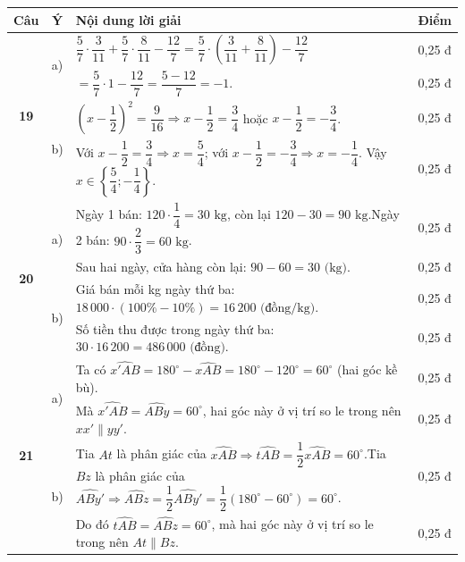 \documentclass[11pt,a4paper]{article}
\begin{document}
\noindent
\begin{tabularx}{\linewidth}{|c|c|X|c|}
\hline
\textbf{Câu} & \textbf{Ý} & \textbf{Nội dung lời giải} & \textbf{Điểm} \\ \hline
\multirow{4}{*}{\textbf{19}} & \multirow{2}{*}{a)} & $\dfrac{5}{7} \cdot \dfrac{3}{11} + \dfrac{5}{7} \cdot \dfrac{8}{11} - \dfrac{12}{7} = \dfrac{5}{7} \cdot \left(\dfrac{3}{11} + \dfrac{8}{11}\right) - \dfrac{12}{7}$ & 0,25 đ \\ \cline{3-4}
& & $= \dfrac{5}{7} \cdot 1 - \dfrac{12}{7} = \dfrac{5 - 12}{7} = -1$. & 0,25 đ \\ \cline{2-4}
& \multirow{2}{*}{b)} & $\left(x - \dfrac{1}{2}\right)^2 = \dfrac{9}{16} \Rightarrow x - \dfrac{1}{2} = \dfrac{3}{4}$ hoặc $x - \dfrac{1}{2} = -\dfrac{3}{4}$. & 0,25 đ \\ \cline{3-4}
& & Với $x - \dfrac{1}{2} = \dfrac{3}{4} \Rightarrow x = \dfrac{5}{4}$; với $x - \dfrac{1}{2} = -\dfrac{3}{4} \Rightarrow x = -\dfrac{1}{4}$. Vậy $x \in \left\{\dfrac{5}{4}; -\dfrac{1}{4}\right\}$. & 0,25 đ \\ \hline

\multirow{4}{*}{\textbf{20}} & \multirow{2}{*}{a)} & Ngày 1 bán: $120 \cdot \dfrac{1}{4} = 30\text{ kg}$, còn lại $120 - 30 = 90\text{ kg}$.\newline Ngày 2 bán: $90 \cdot \dfrac{2}{3} = 60\text{ kg}$. & 0,25 đ \\ \cline{3-4}
& & Sau hai ngày, cửa hàng còn lại: $90 - 60 = 30\text{ (kg)}$. & 0,25 đ \\ \cline{2-4}
& \multirow{2}{*}{b)} & Giá bán mỗi kg ngày thứ ba: $18\,000 \cdot (100\% - 10\%) = 16\,200\text{ (đồng/kg)}$. & 0,25 đ \\ \cline{3-4}
& & Số tiền thu được trong ngày thứ ba: $30 \cdot 16\,200 = 486\,000\text{ (đồng)}$. & 0,25 đ \\ \hline

\multirow{4}{*}{\textbf{21}} & \multirow{2}{*}{a)} & Ta có $\widehat{x'AB} = 180^\circ - \widehat{xAB} = 180^\circ - 120^\circ = 60^\circ$ (hai góc kề bù). & 0,25 đ \\ \cline{3-4}
& & Mà $\widehat{x'AB} = \widehat{ABy} = 60^\circ$, hai góc này ở vị trí so le trong nên $xx' \parallel yy'$. & 0,25 đ \\ \cline{2-4}
& \multirow{2}{*}{b)} & Tia $At$ là phân giác của $\widehat{xAB} \Rightarrow \widehat{tAB} = \dfrac{1}{2}\widehat{xAB} = 60^\circ$.\newline Tia $Bz$ là phân giác của $\widehat{ABy'} \Rightarrow \widehat{ABz} = \dfrac{1}{2}\widehat{ABy'} = \dfrac{1}{2}(180^\circ - 60^\circ) = 60^\circ$. & 0,25 đ \\ \cline{3-4}
& & Do đó $\widehat{tAB} = \widehat{ABz} = 60^\circ$, mà hai góc này ở vị trí so le trong nên $At \parallel Bz$. & 0,25 đ \\ \hline
\end{tabularx}
\end{document}
